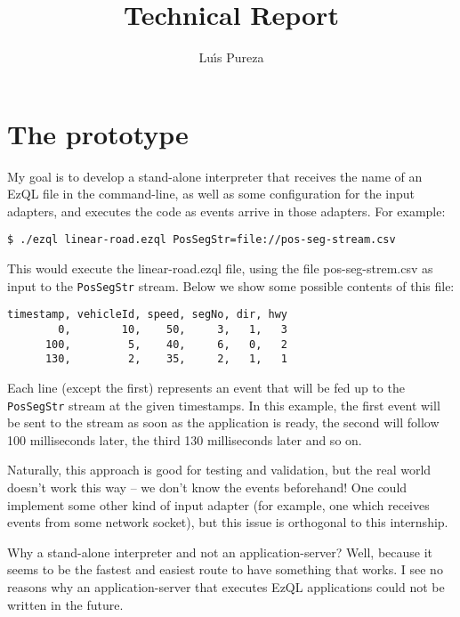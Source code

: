 \documentclass{report}
\begin{document}
\title{Technical Report}
\author{Lu\'{\i}s Pureza}

\maketitle

\tableofcontents

\addtolength{\parskip}{\baselineskip}

\chapter{The prototype}

My goal is to develop a stand-alone interpreter that receives the name
of an EzQL file in the command-line, as well as some configuration for
the input adapters, and executes the code as events arrive in those
adapters. For example:

\begin{verbatim}
$ ./ezql linear-road.ezql PosSegStr=file://pos-seg-stream.csv
\end{verbatim}

This would execute the linear-road.ezql file, using the file
pos-seg-strem.csv as input to the \verb=PosSegStr= stream. Below we
show some possible contents of this file:

\begin{verbatim}
timestamp, vehicleId, speed, segNo, dir, hwy
        0,        10,    50,     3,   1,   3
      100,         5,    40,     6,   0,   2
      130,         2,    35,     2,   1,   1
\end{verbatim}

Each line (except the first) represents an event that will be fed up
to the \verb=PosSegStr= stream at the given timestamps. In this
example, the first event will be sent to the stream as soon as the
application is ready, the second will follow 100 milliseconds later,
the third 130 milliseconds later and so on.

Naturally, this approach is good for testing and validation, but the
real world doesn't work this way -- we don't know the events
beforehand! One could implement some other kind of input adapter (for
example, one which receives events from some network socket), but this
issue is orthogonal to this internship.

Why a stand-alone interpreter and not an application-server? Well,
because it seems to be the fastest and easiest route to have something
that works. I see no reasons why an application-server that executes
EzQL applications could not be written in the future.
\end{document}
